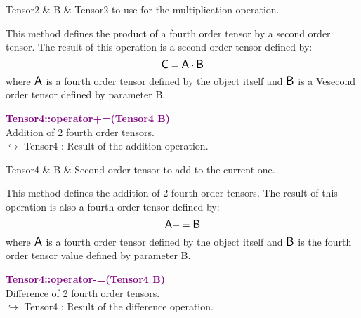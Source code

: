 \begin{tcolorbox}[width=\textwidth,myArgs,tabularx={ll|R}]
Tensor2 & B & Tensor2 to use for the multiplication operation.
\end{tcolorbox}

This method defines the product of a fourth order tensor by a second order tensor.
The result of this operation is a second order tensor defined by:
\begin{equation*}
\mbox{\large\ensuremath{\mathsf{C}}} = \mbox{\large\ensuremath{\mathsf{A}}} \cdot \mbox{\large\ensuremath{\mathsf{B}}}
\end{equation*}
where $\mbox{\large\ensuremath{\mathsf{A}}}$ is a fourth order tensor defined by the object itself and $\mbox{\large\ensuremath{\mathsf{B}}}$ is a Vesecond order tensor defined by parameter B.

\textcolor{purple}{\textbf{Tensor4::operator+=(Tensor4 B)}}\label{Tensor4::operator+=(Tensor4 B)}\\
Addition of 2 fourth order tensors.\\ \hspace*{10mm}$\hookrightarrow$ Tensor4 : Result of the addition operation.

\begin{tcolorbox}[width=\textwidth,myArgs,tabularx={ll|R}]
Tensor4 & B & Second order tensor to add to the current one.
\end{tcolorbox}

This method defines the addition of 2 fourth order tensors.
The result of this operation is also a fourth order tensor defined by:
\begin{equation*}
\mbox{\large\ensuremath{\mathsf{A}}} += \mbox{\large\ensuremath{\mathsf{B}}}
\end{equation*}
where $\mbox{\large\ensuremath{\mathsf{A}}}$ is a fourth order tensor defined by the object itself and $\mbox{\large\ensuremath{\mathsf{B}}}$ is the fourth order tensor value defined by parameter B.

\textcolor{purple}{\textbf{Tensor4::operator-=(Tensor4 B)}}\label{Tensor4::operator-=(Tensor4 B)}\\
Difference of 2 fourth order tensors.\\ \hspace*{10mm}$\hookrightarrow$ Tensor4 : Result of the difference operation.

